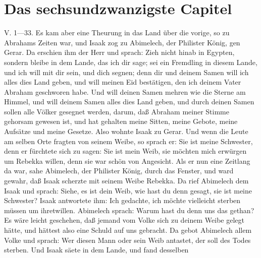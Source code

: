 \section{Das sechsundzwanzigste Capitel}

V. 1—33. Es kam aber eine Theurung in das Land über die vorige, so zu Abrahams Zeiten war, und Isaak zog zu Abimelech, der Philister König, gen Gerar. Da erschien ihm der Herr und sprach: Zieh nicht hinab in Egypten, sondern bleibe in dem Lande, das ich dir sage; sei ein Fremdling in diesem Lande, und ich will mit dir sein, und dich segnen; denn dir und deinem Samen will ich alles dies Land geben, und will meinen Eid bestätigen, den ich deinem Vater Abraham geschworen habe. Und will deinen Samen mehren wie die Sterne am Himmel, und will deinem Samen alles dies Land geben, und durch deinen Samen sollen alle Völker gesegnet werden, darum, daß Abraham meiner Stimme gehorsam gewesen ist, und hat gehalten meine Sitten, meine Gebote, meine Aufsätze und meine Gesetze. Also wohnte Isaak zu Gerar. Und wenn die Leute am selben Orte fragten von seinem Weibe, so sprach er: Sie ist meine Schwester, denn er fürchtete sich zu sagen: Sie ist mein Weib, sie möchten mich erwürgen um Rebekka willen, denn sie war schön von Angesicht. Als er nun eine Zeitlang da war, sahe Abimelech, der Philister König, durch das Fenster, und ward gewahr, daß Isaak scherzte mit seinem Weibe Rebekka. Da rief Abimelech dem Isaak und sprach: Siehe, es ist dein Weib, wie hast du denn gesagt, sie ist meine Schwester? Isaak antwortete ihm: Ich gedachte, ich möchte vielleicht sterben müssen um ihretwillen. Abimelech sprach: Warum hast du denn uns das gethan? Es wäre leicht geschehen, daß jemand vom Volke sich zu deinem Weibe gelegt hätte, und hättest also eine Schuld auf uns gebracht. Da gebot Abimelech allem Volke und sprach: Wer diesen Mann oder sein Weib antastet, der soll des Todes sterben. Und Isaak säete in dem Lande, und fand desselben
